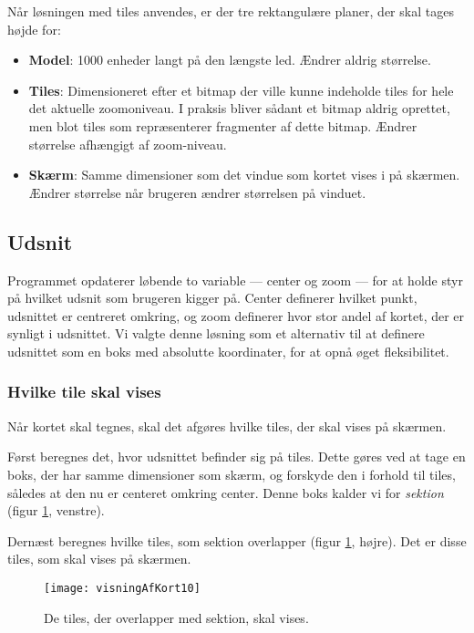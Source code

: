 Når løsningen med tiles anvendes, er der tre rektangulære planer, der skal tages højde for:

\begin{itemize}
	\item \textbf{Model}: 1000 enheder langt på den længste led. Ændrer aldrig størrelse.
	\item \textbf{Tiles}: Dimensioneret efter et bitmap der ville kunne indeholde tiles for hele det aktuelle zoomoniveau. I praksis bliver sådant et bitmap aldrig oprettet, men blot tiles som repræsenterer fragmenter af dette bitmap. Ændrer størrelse afhængigt af zoom-niveau.
	\item \textbf{Skærm}: Samme dimensioner som det vindue som kortet vises i på skærmen. Ændrer størrelse når brugeren ændrer størrelsen på vinduet.
\end{itemize}

\subsection{Udsnit}
\label{subsec:udsnit}

Programmet opdaterer løbende to variable --- center og zoom --- for at holde styr på hvilket udsnit som brugeren kigger på. Center definerer hvilket punkt, udsnittet er centreret omkring, og zoom definerer hvor stor andel af kortet, der er synligt i udsnittet. Vi valgte denne løsning som et alternativ til at definere udsnittet som en boks med absolutte koordinater, for at opnå øget fleksibilitet.

\subsubsection{Hvilke tile skal vises}
\label{subsec:hvilkeTilesSkalVises}

Når kortet skal tegnes, skal det afgøres hvilke tiles, der skal vises på skærmen.

Først beregnes det, hvor udsnittet befinder sig på tiles. Dette gøres ved at tage en boks, der har samme dimensioner som skærm, og forskyde den i forhold til tiles, således at den nu er centeret omkring center. Denne boks kalder vi for \emph{sektion} (figur \ref{figur:visningAfKort10}, venstre).

Dernæst beregnes hvilke tiles, som sektion overlapper (figur \ref{figur:visningAfKort10}, højre). Det er disse tiles, som skal vises på skærmen.

\begin{figure}[h]
	\centering
	\texttt{[image: visningAfKort10]}
	\captionsetup{width=0.8\textwidth}
	\caption{De tiles, der overlapper med sektion, skal vises.}
	\label{figur:visningAfKort10}
\end{figure}

